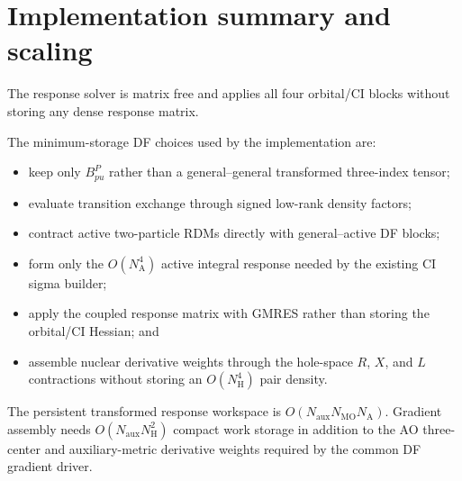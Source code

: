 \documentclass[aip,preprint,nofootinbib]{revtex4-1}
\begin{document}
\section{Implementation summary and scaling}

The response solver is matrix free and applies all four orbital/CI blocks
without storing any dense response matrix.

The minimum-storage DF choices used by the implementation are:
\begin{itemize}
 \item keep only $B^P_{pu}$ rather than a general--general transformed
       three-index tensor;
 \item evaluate transition exchange through signed low-rank density factors;
 \item contract active two-particle RDMs directly with general--active DF
       blocks;
 \item form only the $O(N_{\mathrm A}^4)$ active integral response needed by
       the existing CI sigma builder;
 \item apply the coupled response matrix with GMRES rather than storing the
       orbital/CI Hessian; and
 \item assemble nuclear derivative weights through the hole-space $R$, $X$,
       and $L$ contractions without storing an $O(N_{\mathrm H}^4)$ pair
       density.
\end{itemize}
The persistent transformed response workspace is
$O(N_{\mathrm{aux}}N_{\mathrm{MO}}N_{\mathrm A})$.  Gradient assembly needs
$O(N_{\mathrm{aux}}N_{\mathrm H}^2)$ compact work storage in addition to the
AO three-center and auxiliary-metric derivative weights required by the
common DF gradient driver.
\end{document}
